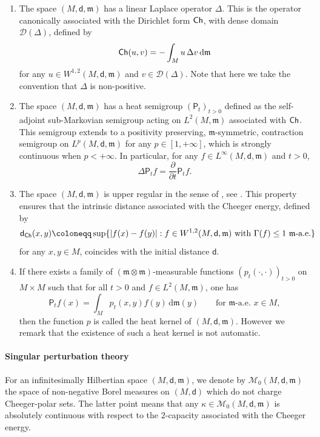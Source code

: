 \documentclass[10pt]{article}
\newcommand{\m}{\mathfrak{m}}
\newcommand{\M}{{\mathit{M}}}
\renewcommand{\d}{\,\mathrm{d}}
\newcommand{\D}{\mathscr{D}}
\renewcommand{\P}{\mathsf{P}}
\newcommand{\dist}{\mathsf{d}}
\newcommand{\df}{\coloneqq}
\newcommand{\Ch}{{\sf Ch}}
\theoremstyle{plain}
\theoremstyle{definition}
\newcommand{\Ltwo}{L^2(M,\m)}
\newcommand{\Sob}{W^{1,2}(M,\dist,\m)}
\begin{document}
\begin{enumerate}
    \item The space $(M,\dist,\m)$ has a linear Laplace operator $\Delta$. This is the operator canonically associated with the Dirichlet form $\Ch$, with dense domain $\D(\Delta)$, defined by
\begin{align*}
    \Ch(u,v) = -\int_M u\,\Delta v\d\m
\end{align*}
for any $u \in \Sob$ and $v \in \D(\Delta)$. Note that here we take the convention that $\Delta$ is non-positive.
\item The space $(M,\dist,\m)$ has a heat semigroup $(\P_t)_{t > 0}$ defined as the self-adjoint sub-Markovian semigroup acting on $\Ltwo$ associated with $\Ch$. This semigroup extends to a positivity preserving, $\m$-symmetric, contraction semigroup on $L^p(\M,\dist,\m)$ for any $p \in [1,+\infty]$, which is strongly continuous when $p < +\infty$. In particular, for any $f \in L^\infty(\M,\dist,\m)$ and $t > 0$,
\[
\Delta \P_tf = \frac{\partial}{\partial t} \P_tf.
\]

\item The space $(M,\dist,\m)$ is upper regular in the sense of \cite[Definition 3.13]{AGSAnnProb}, see \cite[Section 8.3]{AGSIber}. This property ensures that the intrinsic distance associated with the Cheeger energy, defined by
\[
\dist_{\Ch} (x,y) \df \sup \{|f(x)-f(y)| : f \in \Sob \text{ with } \Gamma(f)\le 1 \text{ $\m$-a.e.} \}
\]
for any $x,y \in M$,
coincides with the initial distance $\dist$.
\item If there exists a family of $(\m\otimes\m)$-measurable functions $(p_t(\cdot,\cdot))_{t>0}$ on $M\times M$ such that for all $t>0$ and $f \in \Ltwo$, one has 
\[
\P_tf(x) = \int_Mp_t(x,y)f(y) \d \m(y) \qquad \text{for $\m$-a.e.~$x \in M$},
\]
then the function $p$ is called the heat kernel of $(M,\dist,\m)$. However we remark that the existence of such a heat kernel is not automatic. 
\end{enumerate} 


\paragraph{Singular perturbation theory} For an infinitesimally Hilbertian  space $ (M,\dist,\m)$, we denote by $\mathcal{M}_0(M,\dist,\m)$ the space of non-negative Borel measures on $(M,\dist)$ which do not charge Cheeger-polar sets. The latter point means that any $\kappa \in \mathcal{M}_0(M,\dist,\m)$ is absolutely continuous with respect to the $2$-capacity associated with the Cheeger energy.
\end{document}
